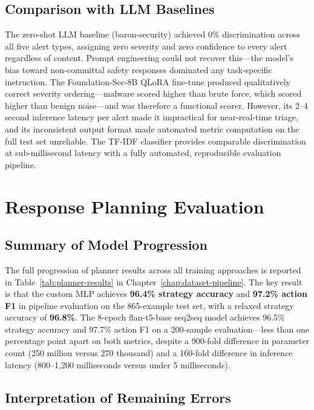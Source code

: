 \subsection{Comparison with LLM Baselines}

The zero-shot LLM baseline (baron-security) achieved 0\% discrimination across all five alert types, assigning zero severity and zero confidence to every alert regardless of content. Prompt engineering could not recover this---the model's bias toward non-committal safety responses dominated any task-specific instruction. The Foundation-Sec-8B QLoRA fine-tune produced qualitatively correct severity ordering---malware scored higher than brute force, which scored higher than benign noise---and was therefore a functional scorer. However, its 2--4 second inference latency per alert made it impractical for near-real-time triage, and its inconsistent output format made automated metric computation on the full test set unreliable. The TF-IDF classifier provides comparable discrimination at sub-millisecond latency with a fully automated, reproducible evaluation pipeline.

\section{Response Planning Evaluation}
\label{sec:eval-planning}

\subsection{Summary of Model Progression}

The full progression of planner results across all training approaches is reported in Table~\ref{tab:planner-results} in Chapter~\ref{chap:dataset-pipeline}. The key result is that the custom MLP achieves \textbf{96.4\% strategy accuracy} and \textbf{97.2\% action F1} in pipeline evaluation on the 865-example test set, with a relaxed strategy accuracy of \textbf{96.8\%}. The 8-epoch flan-t5-base seq2seq model achieves 96.5\% strategy accuracy and 97.7\% action F1 on a 200-sample evaluation---less than one percentage point apart on both metrics, despite a 900-fold difference in parameter count (250 million versus 270 thousand) and a 160-fold difference in inference latency (800--1,200 milliseconds versus under 5 milliseconds).

\subsection{Interpretation of Remaining Errors}

